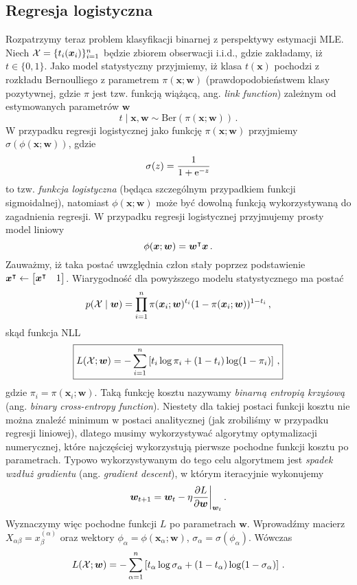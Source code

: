 \documentclass{myclass}
\begin{document}
\subsection{Regresja logistyczna}

Rozpatrzymy teraz problem klasyfikacji binarnej z perspektywy estymacji MLE. Niech \(\mathcal{X} =
\{t_i(\bm{x}_i)\}_{i=1}^n\) będzie zbiorem obserwacji i.i.d., gdzie zakładamy, iż \(t \in \{0,1\}\).
Jako model statystyczny przyjmiemy, iż klasa \(t(\bm{x})\) pochodzi z rozkładu Bernoulliego z
parametrem \(\pi(\bm{x}; \bm{w})\) (prawdopodobieństwem klasy pozytywnej, gdzie \(\pi\) jest tzw.
funkcją wiążącą, ang. \emph{link function}) zależnym od estymowanych parametrów \(\bm{w}\)
\[
t \mid \bm{x}, \bm{w} \sim \mathrm{Ber}(\pi(\bm{x}; \bm{w}))\,.
\]
W przypadku regresji logistycznej jako funkcję \(\pi(\bm{x}; \bm{w})\) przyjmiemy
\(\sigma(\phi(\bm{x}; \bm{w}))\), gdzie
\[
\sigma(z) = \frac{1}{1 + \mathrm{e}^{-z}}
\]
to tzw. \emph{funkcja logistyczna} (będąca szczególnym przypadkiem funkcji sigmoidalnej), natomiast
\(\phi(\bm{x}; \bm{w})\) może być dowolną funkcją wykorzystywaną do zagadnienia regresji. W
przypadku regresji logistycznej przyjmujemy prosty model liniowy
\[
\phi(\bm{x}; \bm{w}) = \bm{w}^\intercal \bm{x}\,.
\]
Zauważmy, iż taka postać uwzględnia człon stały poprzez podstawienie \(\bm{x}^\tpose \leftarrow
\mqty[\bm{x}^\tpose & 1]\). Wiarygodność dla powyższego modelu statystycznego ma postać
\[
p(\mathcal{X} \mid \bm{w}) = \prod_{i=1}^n \pi(\bm{x}_i;\bm{w})^{t_i} (1 - \pi(\bm{x}_i;\bm{w}))^{1 - t_i}\,,
\]
skąd funkcja NLL
\[
\boxed{
    L(\mathcal{X}; \bm{w}) = - \sum_{i=1}^n \left[ t_i \log \pi_i + (1 - t_i) \log (1 - \pi_i) \right]\,,
}
\]
gdzie \(\pi_i = \pi(\bm{x}_i; \bm{w})\). Taką funkcję kosztu nazywamy \emph{binarną entropią
krzyżową} (ang. \emph{ binary cross-entropy function}). Niestety dla takiej postaci funkcji kosztu
nie można znaleźć minimum w postaci analitycznej (jak zrobiliśmy w przypadku regresji liniowej),
dlatego musimy wykorzystywać algorytmy optymalizacji numerycznej, które najczęściej wykorzystują
pierwsze pochodne funkcji kosztu po parametrach. Typowo wykorzystywanym do tego celu algorytmem jest
\emph{spadek wzdłuż gradientu} (ang. \emph{gradient descent}), w którym iteracyjnie wykonujemy
\[
    \bm{w}_{t+1} = \bm{w}_t - \eta \pdv{L}{\bm{w}}\bigg|_{\bm{w}_t}\,.
\]    
Wyznaczymy więc pochodne funkcji \(L\) po parametrach \(\bm{w}\). Wprowadźmy macierz
\(X_{\alpha\beta} = x_\beta^{(\alpha)}\) oraz wektory \(\phi_\alpha = \phi(\bm{x}_\alpha; \bm{w})\),
\(\sigma_\alpha = \sigma(\phi_\alpha)\). Wówczas
\[
L(\mathcal{X}; \bm{w}) = - \sum_{\alpha=1}^n \left[ t_\alpha \log \sigma_\alpha + (1 - t_\alpha) \log(1 - \sigma_\alpha) \right]\,.
\]
\end{document}
